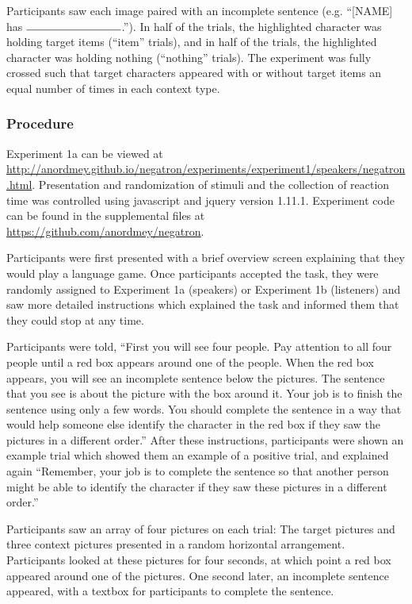 \documentclass[man, floatsintext, noapacite]{apa6}
\begin{document}
Participants saw each image paired with an incomplete sentence (e.g. ``[NAME] has $\rule{3cm}{0.15mm}$.''). In half of the trials, the highlighted character was holding target items (``item'' trials), and in half of the trials, the highlighted character was holding nothing (``nothing'' trials).  The experiment was fully crossed such that target characters appeared with or without target items an equal number of times in each context type. 

\subsubsection{Procedure}

Experiment 1a can be viewed at \url{http://anordmey.github.io/negatron/experiments/experiment1/speakers/negatron.html}. Presentation and randomization of stimuli and the collection of reaction time was controlled using javascript and jquery version 1.11.1. Experiment code can be found in the supplemental files at  \url{https://github.com/anordmey/negatron}.

 Participants were first presented with a brief overview screen explaining that they would play a language game.  Once participants accepted the task, they were randomly assigned to Experiment 1a (speakers) or Experiment 1b (listeners) and saw more detailed instructions which explained the task and informed them that they could stop at any time. 

Participants were told, ``First you will see four people. Pay attention to all four people until a red box appears around one of the people. When the red box appears, you will see an incomplete sentence below the pictures. The sentence that you see is about the picture with the box around it. Your job is to finish the sentence using only a few words. You should complete the sentence in a way that would help someone else identify the character in the red box if they saw the pictures in a different order.'' After these instructions, participants were shown an example trial which showed them an example of a positive trial, and explained again ``Remember, your job is to complete the sentence so that another person might be able to identify the character if they saw these pictures in a different order.''

Participants saw an array of four pictures on each trial: The target pictures and three context pictures presented in a random horizontal arrangement.  Participants looked at these pictures for four seconds, at which point a red box appeared around one of the pictures.  One second later, an incomplete sentence appeared, with a textbox for participants to complete the sentence. 
\end{document}

